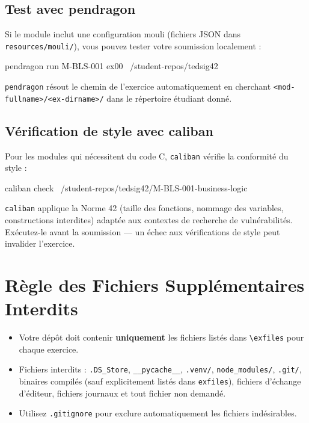 
\subsection*{Test avec pendragon}

Si le module inclut une configuration mouli (fichiers JSON dans
\texttt{resources/mouli/}), vous pouvez tester votre soumission localement :

\begin{console}
pendragon run M-BLS-001 ex00 ~/student-repos/tedsig42
\end{console}

\texttt{pendragon} r\'esout le chemin de l'exercice automatiquement en
cherchant \texttt{<mod-fullname>/<ex-dirname>/} dans le r\'epertoire
\'etudiant donn\'e.

\subsection*{V\'erification de style avec caliban}

Pour les modules qui n\'ecessitent du code C, \texttt{caliban} v\'erifie
la conformit\'e du style :

\begin{console}
caliban check ~/student-repos/tedsig42/M-BLS-001-business-logic
\end{console}

\texttt{caliban} applique la Norme 42 (taille des fonctions, nommage
des variables, constructions interdites) adapt\'ee aux contextes de
recherche de vuln\'erabilit\'es. Ex\'ecutez-le avant la soumission ---
un \'echec aux v\'erifications de style peut invalider l'exercice.

\section{R\`egle des Fichiers Suppl\'ementaires Interdits}

\begin{itemize}
  \item Votre d\'ep\^ot doit contenir \textbf{uniquement} les fichiers
        list\'es dans \texttt{\textbackslash exfiles} pour chaque exercice.
  \item Fichiers interdits : \texttt{.DS\_Store}, \texttt{\_\_pycache\_\_},
        \texttt{.venv/}, \texttt{node\_modules/}, \texttt{.git/},
        binaires compil\'es (sauf explicitement list\'es dans \texttt{exfiles}),
        fichiers d'\'echange d'\'editeur, fichiers journaux et tout fichier
        non demand\'e.
  \item Utilisez \texttt{.gitignore} pour exclure automatiquement les
        fichiers ind\'esirables.
\end{itemize}

